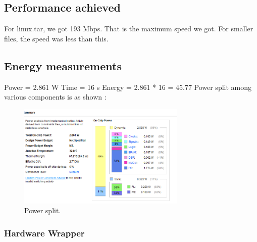 \documentclass{article}
\begin{document}
\subsection{Performance achieved}
For linux.tar, we got 193 Mbps. That is the maximum speed we got. For smaller files, the speed was less than this. 

\subsection{Energy measurements}
Power = 2.861 W
\newline
Time = 16 s
\newline
Energy = 2.861 * 16 = 45.77
\newline
Power split among various components is as shown :
\begin{figure}[hbt!]
  \includegraphics[width=80mm, scale=0.5]{power.png}
  \caption{Power split.}
  \label{fig:power}
\end{figure}

\subsubsection{Hardware Wrapper}
\end{document}
